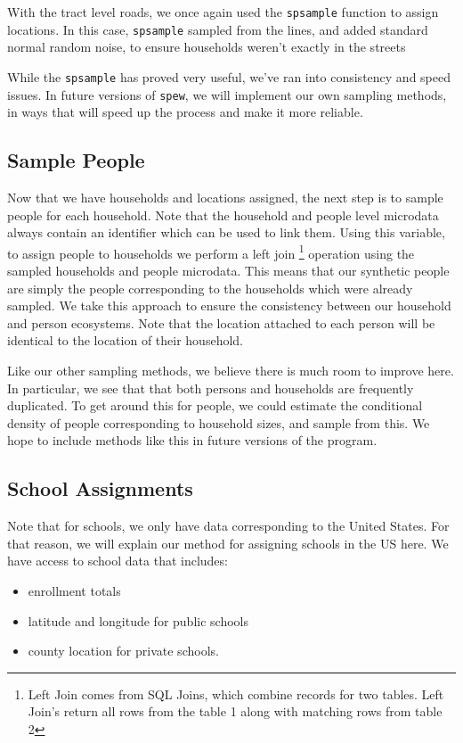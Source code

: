 \documentclass{article}
\begin{document}
		With the tract level roads, we once again used the \verb|spsample| function to assign locations. In this case, \verb|spsample| sampled from the lines, and added standard normal random noise, to ensure households weren't exactly in the streets 


		While the \verb|spsample| has proved very useful, we've ran into consistency and speed issues. In future versions of \verb|spew|, we will implement our own sampling methods, in ways that will speed up the process and make it more reliable. 

	\subsection{Sample People}

		Now that we have households and locations assigned, the next step is to sample people for each household. Note that the household and people level microdata always contain an identifier which can be used to link them. Using this variable, to assign people to households we perform a left join \footnote{Left Join comes from SQL Joins, which combine records for two tables. Left Join's return all rows from the table 1 along with matching rows from table 2} operation using the sampled households and people microdata. This means that our synthetic people are simply the people corresponding to the households which were already sampled. We take this approach to ensure the consistency between our household and person ecosystems. Note that the location attached to each person will be identical to the location of their household. 

		Like our other sampling methods, we believe there is much room to improve here. In particular, we see that that both persons and households are frequently duplicated. To get around this for people, we could estimate the conditional density of people corresponding to household sizes, and sample from this. We hope to include methods like this in future versions of the program. 

	\subsection{School Assignments}

		Note that for schools, we only have data corresponding to the United States. For that reason, we will explain our method for assigning schools in the US here. We have access to school data that includes:

			\begin{itemize}
				\item enrollment totals 
				\item latitude and longitude for public schools 
				\item county location for private schools.  
			\end{itemize}
\end{document}
